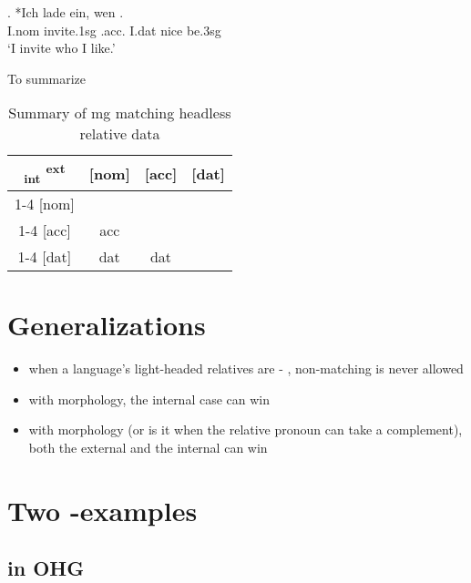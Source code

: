 \exg. *Ich {lade ein}, wen   .\\
I.\ac{nom} invite.1\ac{sg}\scsub{[acc]} .\ac{acc}. I.\ac{dat} nice be.3\ac{sg}\scsub{[nom]}\\
`I invite who I like.' \label{ex:mg-acc-nom}

To summarize

\begin{table}[H]
  \center
  \caption {Summary of \ac{mg} matching headless relative data}
		\begin{tabular}{c|c|c|c}
		  \toprule
			\textsubscript{\ac{int}} \textsuperscript{\ac{ext}}
		        & [\ac{nom}]
		        & [\ac{acc}]
		        & [\ac{dat}]
		        \\ \cmidrule{1-4}
		    [\ac{nom}]
		        &
		        &
		        &
		        \\ \cmidrule{1-4}
		    [\ac{acc}]
		        & \ac{acc}
		        &
		        &
		        \\ \cmidrule{1-4}
		    [\ac{dat}]
		        & \ac{dat}
		        & \ac{dat}
		        &
		        \\
		  \bottomrule
		\end{tabular}
\end{table}







\section{Generalizations}

\begin{itemize}
  \item when a language's light-headed relatives are  - , non-matching is never allowed
  \item with  morphology, the internal case can win
  \item with  morphology (or is it when the relative pronoun can take a complement), both the external and the internal can win
\end{itemize}


\section{Two -examples}

\subsection{ in OHG}

